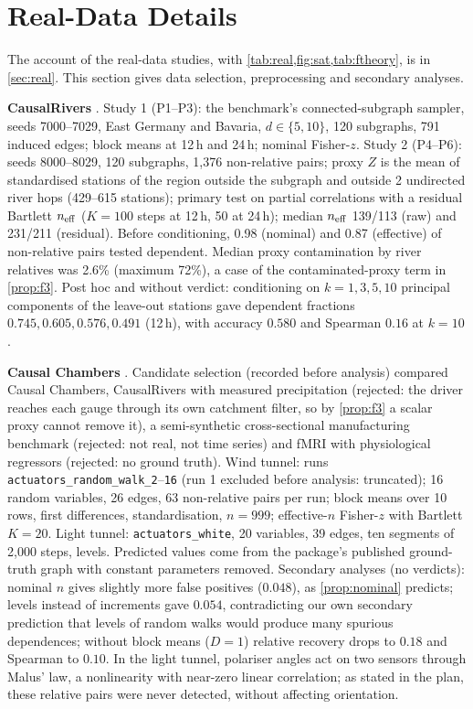 \section{Real-Data Details}
\label{app:real}

The account of the real-data studies, with \cref{tab:real,fig:sat,tab:ftheory}, is in
\cref{sec:real}. This section gives data selection, preprocessing and
secondary analyses.

\textbf{CausalRivers} \citep{stein2025causalrivers}. Study 1 (P1--P3): the
benchmark's connected-subgraph sampler, seeds 7000--7029, East Germany and
Bavaria, $d\in\{5,10\}$, 120 subgraphs, 791 induced edges; block means at
12\,h and 24\,h; nominal Fisher-$z$. Study 2 (P4--P6): seeds 8000--8029, 120
subgraphs, 1{,}376 non-relative pairs; proxy $Z$ is the mean of standardised
stations of the region outside the subgraph and outside 2 undirected river
hops (429--615 stations); primary test on partial correlations with a residual
Bartlett $n_{\mathrm{eff}}$ ($K=100$ steps at 12\,h, 50 at 24\,h); median $n_{\mathrm{eff}}$ 139/113
(raw) and 231/211 (residual). Before conditioning, 0.98 (nominal) and 0.87
(effective) of non-relative pairs tested dependent. Median proxy
contamination by river relatives was 2.6\% (maximum 72\%), a case of the
contaminated-proxy term in \cref{prop:f3}. Post hoc and without verdict:
conditioning on $k=1,3,5,10$ principal components of the leave-out stations
gave dependent fractions $0.745,0.605,0.576,0.491$ (12\,h), with accuracy
$0.580$ and Spearman $0.16$ at $k=10$.

\textbf{Causal Chambers} \citep{gamella2025chambers}. Candidate selection
(recorded before analysis) compared Causal Chambers, CausalRivers with
measured precipitation (rejected: the driver reaches each gauge through its
own catchment filter, so by \cref{prop:f3} a scalar proxy cannot remove it),
a semi-synthetic cross-sectional manufacturing benchmark (rejected: not real,
not time series) and fMRI with physiological regressors (rejected: no ground
truth). Wind tunnel: runs \texttt{actuators\_random\_walk\_2}--\texttt{16} (run
1 excluded before analysis: truncated); 16 random variables, 26 edges, 63
non-relative pairs per run; block means over 10 rows, first differences,
standardisation, $n=999$; effective-$n$ Fisher-$z$ with Bartlett $K=20$.
Light tunnel: \texttt{actuators\_white}, 20 variables, 39 edges, ten segments
of 2{,}000 steps, levels. Predicted values come from the package's published
ground-truth graph with constant parameters removed.
Secondary analyses (no verdicts): nominal $n$ gives slightly more false
positives ($0.048$), as \cref{prop:nominal} predicts; levels instead of
increments gave $0.054$, contradicting our own secondary prediction that
levels of random walks would produce many spurious dependences; without block
means ($D=1$) relative recovery drops to $0.18$ and Spearman to $0.10$. In the
light tunnel, polariser angles act on two sensors through Malus' law, a
nonlinearity with near-zero linear correlation; as stated in the plan, these
relative pairs were never detected, without affecting orientation.

